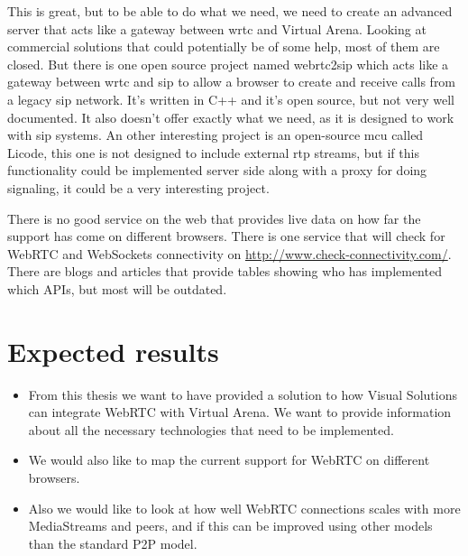 This is great, but to be able to do what we need, we need to create an advanced server that acts like a gateway between \gls{wrtc} and Virtual Arena. Looking at commercial solutions that could potentially be of some help, most of them are closed. But there is one open source project named webrtc2sip\cite{doubango_telecom_webrtc2sip_2014} which acts like a gateway between \gls{wrtc} and \gls{sip} to allow a browser to create and receive calls from a legacy \gls{sip} network. It's written in C++ and it's open source, but not very well documented. It also doesn't offer exactly what we need, as it is designed to work with \gls{sip} systems. An other interesting project is an open-source \gls{mcu} called Licode\cite{lynckia_licode_2014}, this one is not designed to include external \gls{rtp} streams, but if this functionality could be implemented server side along with a proxy for doing signaling, it could be a very interesting project.

There is no good service on the web that provides live data on how far the support has come on different browsers. There is one service that will check for WebRTC and WebSockets connectivity on \url{http://www.check-connectivity.com/}. There are blogs and articles that provide tables showing who has implemented which APIs, but most will be outdated.


\section{Expected results}

\begin{itemize}
    \item From this thesis we want to have provided a solution to how Visual Solutions can integrate WebRTC with Virtual Arena. We want to provide information about all the necessary technologies that need to be implemented.
    \item We would also like to map the current support for WebRTC on different browsers.
    \item Also we would like to look at how well WebRTC connections scales with more MediaStreams and peers, and if this can be improved using other models than the standard P2P model.
\end{itemize}
